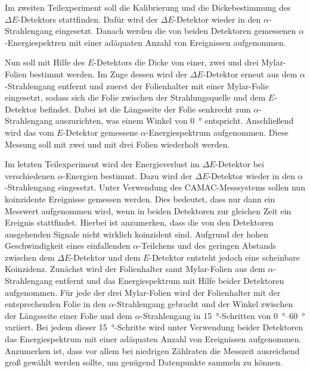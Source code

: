 Im zweiten Teilexperiment soll die Kalibrierung und die Dickebestimmung des $\Delta E$-Detektors stattfinden.
Dafür wird der $\Delta E$-Detektor wieder in den $\alpha$-Strahlengang eingesetzt.
Danach werden die von beiden Detektoren gemessenen $\alpha$-Energiespektren mit einer adäquaten Anzahl von Ereignissen aufgenommen.

Nun soll mit Hilfe des $E$-Detektors die Dicke von einer, zwei und drei Mylar-Folien bestimmt werden.
Im Zuge dessen wird der $\Delta E$-Detektor erneut aus dem $\alpha$-Strahlengang entfernt und zuerst der Folienhalter mit einer Mylar-Folie eingesetzt, sodass sich die Folie zwischen der Strahlungsquelle und dem $E$-Detektor befindet.
Dabei ist die Längsseite der Folie senkrecht zum $\alpha$-Strahlengang auszurichten, was einem Winkel von \SI{0}{\degree} entspricht.
Anschließend wird das vom $E$-Detektor gemessene $\alpha$-Energiespektrum aufgenommen.
Diese Messung soll mit zwei und mit drei Folien wiederholt werden.

Im letzten Teilexperiment wird der Energieverlust im $\Delta E$-Detektor bei verschiedenen $\alpha$-Energien bestimmt.
Dazu wird der $\Delta E$-Detektor wieder in den $\alpha$-Strahlengang eingesetzt.
Unter Verwendung des CAMAC-Messsystems sollen nun koinzidente Ereignisse gemessen werden.
Dies bedeutet, dass nur dann ein Messwert aufgenommen wird, wenn in beiden Detektoren zur gleichen Zeit ein Ereignis stattfindet.
Hierbei ist anzumerken, dass die von den Detektoren ausgehenden Signale nicht wirklich koinzident sind.
Aufgrund der hohen Geschwindigkeit eines einfallenden $\alpha$-Teilchens und des geringen Abstands zwischen dem $\Delta E$-Detektor und dem $E$-Detektor entsteht jedoch eine scheinbare Koinzidenz.
Zunächst wird der Folienhalter samt Mylar-Folien aus dem $\alpha$-Strahlengang entfernt und das Energiespektrum mit Hilfe beider Detektoren aufgenommen.
Für jede der drei Mylar-Folien wird der Folienhalter mit der entsprechenden Folie in den $\alpha$-Strahlengang gebracht und der Winkel zwischen der Längsseite einer Folie und dem $\alpha$-Strahlengang in \SI{15}{\degree}-Schritten von \SIrange{0}{60}{\degree} variiert.
Bei jedem dieser \SI{15}{\degree}-Schritte wird unter Verwendung beider Detektoren das Energiespektrum mit einer adäquaten Anzahl von Ereignissen aufgenommen.
Anzumerken ist, dass vor allem bei niedrigen Zählraten die Messzeit ausreichend groß gewählt werden sollte, um genügend Datenpunkte sammeln zu können.
